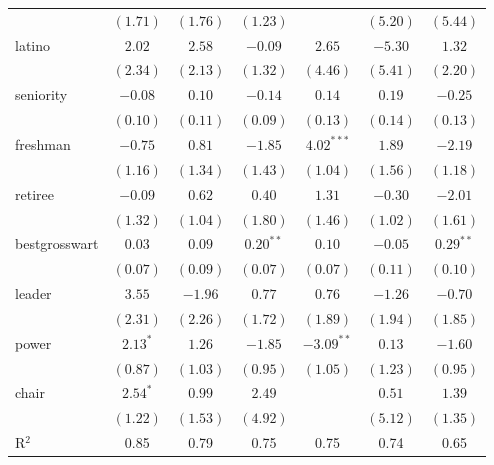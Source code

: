 \documentclass[12pt]{article}
\begin{document}
\begin{table}
\begin{center}
\begin{tabular}{l c c c c c c }
			& $(1.71)$     & $(1.76)$      & $(1.23)$      &              & $(5.20)$       & $(5.44)$      \\
			latino                 & $2.02$       & $2.58$        & $-0.09$       & $2.65$       & $-5.30$        & $1.32$        \\
			& $(2.34)$     & $(2.13)$      & $(1.32)$      & $(4.46)$     & $(5.41)$       & $(2.20)$      \\
			seniority              & $-0.08$      & $0.10$        & $-0.14$       & $0.14$       & $0.19$         & $-0.25$       \\
			& $(0.10)$     & $(0.11)$      & $(0.09)$      & $(0.13)$     & $(0.14)$       & $(0.13)$      \\
			freshman               & $-0.75$      & $0.81$        & $-1.85$       & $4.02^{***}$ & $1.89$         & $-2.19$       \\
			& $(1.16)$     & $(1.34)$      & $(1.43)$      & $(1.04)$     & $(1.56)$       & $(1.18)$      \\
			retiree                & $-0.09$      & $0.62$        & $0.40$        & $1.31$       & $-0.30$        & $-2.01$       \\
			& $(1.32)$     & $(1.04)$      & $(1.80)$      & $(1.46)$     & $(1.02)$       & $(1.61)$      \\
			bestgrosswart          & $0.03$       & $0.09$        & $0.20^{**}$   & $0.10$       & $-0.05$        & $0.29^{**}$   \\
			& $(0.07)$     & $(0.09)$      & $(0.07)$      & $(0.07)$     & $(0.11)$       & $(0.10)$      \\
			leader                 & $3.55$       & $-1.96$       & $0.77$        & $0.76$       & $-1.26$        & $-0.70$       \\
			& $(2.31)$     & $(2.26)$      & $(1.72)$      & $(1.89)$     & $(1.94)$       & $(1.85)$      \\
			power                  & $2.13^{*}$   & $1.26$        & $-1.85$       & $-3.09^{**}$ & $0.13$         & $-1.60$       \\
			& $(0.87)$     & $(1.03)$      & $(0.95)$      & $(1.05)$     & $(1.23)$       & $(0.95)$      \\
			chair                  & $2.54^{*}$   & $0.99$        & $2.49$        &              & $0.51$         & $1.39$        \\
			& $(1.22)$     & $(1.53)$      & $(4.92)$      &              & $(5.12)$       & $(1.35)$      \\
			\hline
			R$^2$                  & 0.85         & 0.79          & 0.75          & 0.75         & 0.74           & 0.65          \\

\end{tabular}
\end{center}
\end{table}
\end{document}
